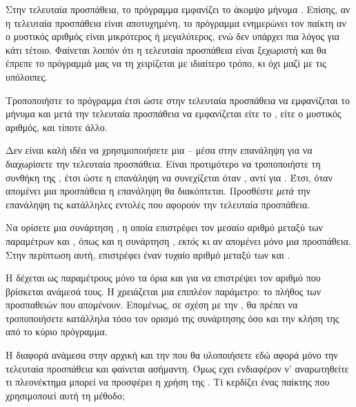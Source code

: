 \documentclass[a4paper,11pt,oneside]{book}
\begin{document}
\begin{exercise}
Στην τελευταία προσπάθεια, το πρόγραμμα εμφανίζει το άκομψο μήνυμα . Επίσης, αν η τελευταία προσπάθεια είναι αποτυχημένη, το πρόγραμμα ενημερώνει τον παίκτη αν ο μυστικός αριθμός είναι μικρότερος ή μεγαλύτερος, ενώ δεν υπάρχει πια λόγος για κάτι τέτοιο. Φαίνεται λοιπόν ότι η τελευταία προσπάθεια είναι ξεχωριστή και θα έπρεπε το πρόγραμμά μας να τη χειρίζεται με ιδιαίτερο τρόπο, κι όχι μαζί με τις υπόλοιπες.%

Τροποποιήστε το πρόγραμμα έτσι ώστε στην τελευταία προσπάθεια να εμφανίζεται το μήνυμα  και μετά την τελευταία προσπάθεια να εμφανίζεται είτε το , είτε ο μυστικός αριθμός, και τίποτε άλλο.

\begin{note}
Δεν είναι καλή ιδέα να χρησιμοποιήσετε μια -- μέσα στην επανάληψη για να διαχωρίσετε την τελευταία προσπάθεια. Είναι προτιμότερο να τροποποιήστε τη συνθήκη της , έτσι ώστε η επανάληψη να συνεχίζεται όταν , αντί για . Έτσι, όταν απομένει μια προσπάθεια η επανάληψη θα διακόπτεται. Προσθέστε \emph{μετά} την επανάληψη τις κατάλληλες εντολές που αφορούν την τελευταία προσπάθεια.
\end{note}
%
\end{exercise}

\begin{exercise}
Να ορίσετε μια συνάρτηση , η οποία επιστρέφει τον μεσαίο αριθμό μεταξύ των παραμέτρων  και , όπως και η συνάρτηση , \emph{εκτός} κι αν απομένει μόνο μια προσπάθεια. Στην περίπτωση αυτή, επιστρέφει έναν τυχαίο αριθμό μεταξύ των  και .

\begin{note}
Η  δέχεται ως παραμέτρους μόνο τα όρια  και  για να επιστρέψει τον αριθμό που βρίσκεται ανάμεσά τους. Η  χρειάζεται μια επιπλέον παράμετρο: το πλήθος των προσπαθειών που απομένουν. Επομένως, σε σχέση με την , θα πρέπει να τροποποιήσετε κατάλληλα τόσο τον ορισμό της συνάρτησης όσο και την κλήση της από το κύριο πρόγραμμα.
\end{note}

Η διαφορά ανάμεσα στην αρχική  και την  που θα υλοποιήσετε εδώ αφορά μόνο την τελευταία προσπάθεια και φαίνεται ασήμαντη. Όμως εχει ενδιαφέρον ν' αναρωτηθείτε τι πλεονέκτημα μπορεί να προσφέρει η χρήση της . Τί κερδίζει ένας παίκτης που χρησιμοποιεί αυτή τη μέθοδο;
\end{exercise}
\end{document}
